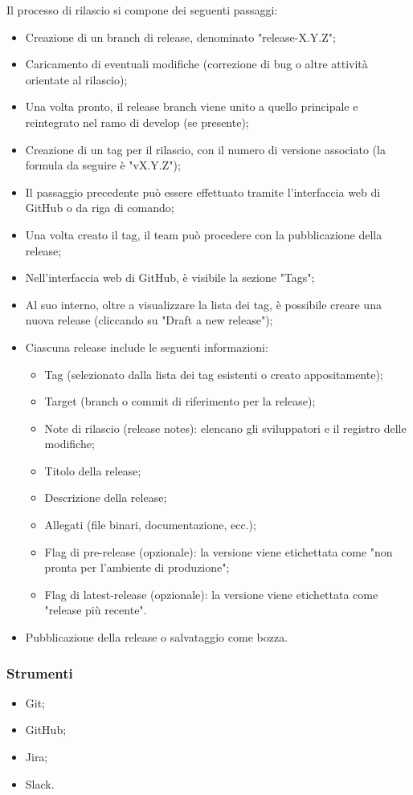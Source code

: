\vspace{0.5\baselineskip}
\par Il processo di rilascio si compone dei seguenti passaggi:
\begin{itemize}
  \item Creazione di un branch di release, denominato "release-X.Y.Z";
  \item Caricamento di eventuali modifiche (correzione di bug o altre attività orientate al rilascio);
  \item Una volta pronto, il release branch viene unito a quello principale e reintegrato nel ramo di develop (se presente);
  \item Creazione di un tag per il rilascio, con il numero di versione associato (la formula da seguire è "vX.Y.Z");
  \item Il passaggio precedente può essere effettuato tramite l'interfaccia web di GitHub o da riga di comando;
  \item Una volta creato il tag, il team può procedere con la pubblicazione della release;
  \item Nell'interfaccia web di GitHub, è visibile la sezione "Tags";
  \item Al suo interno, oltre a visualizzare la lista dei tag, è possibile creare una nuova release (cliccando su "Draft a new release");
  \item Ciascuna release include le seguenti informazioni:
  \begin{itemize}
    \item Tag (selezionato dalla lista dei tag esistenti o creato appositamente);
    \item Target (branch o commit di riferimento per la release);
    \item Note di rilascio (release notes): elencano gli sviluppatori e il registro delle modifiche;
    \item Titolo della release;
    \item Descrizione della release;
    \item Allegati (file binari, documentazione, ecc.);
    \item Flag di pre-release (opzionale): la versione viene etichettata come "non pronta per l'ambiente di produzione";
    \item Flag di latest-release (opzionale): la versione viene etichettata come "release più recente".
  \end{itemize}
  \item Pubblicazione della release o salvataggio come bozza.
\end{itemize}

\subsubsection{Strumenti}
\IntroStrumenti
\begin{itemize}
  \item Git;
  \item GitHub;
  \item Jira;
  \item Slack.
\end{itemize}

